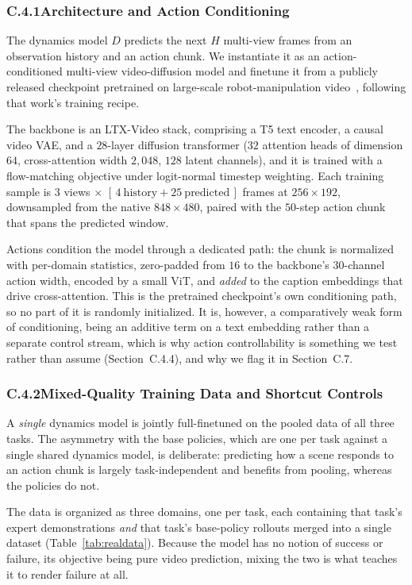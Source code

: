 \documentclass[letterpaper]{article} %
\begin{document}
\subsubsection{C.4.1\quad Architecture and Action Conditioning}

The dynamics model $D$ predicts the next $H$ multi-view frames from an
observation history and an action chunk. We instantiate it as an
action-conditioned multi-view video-diffusion model and finetune it from a
publicly released checkpoint pretrained on large-scale robot-manipulation
video~\cite{yang2026rise}, following that work's training recipe.

The backbone is an LTX-Video stack, comprising a T5 text encoder, a causal video VAE, and a
$28$-layer diffusion transformer ($32$ attention heads of dimension $64$,
cross-attention width $2{,}048$, $128$ latent channels), and it is trained with a flow-matching
objective under logit-normal timestep weighting. Each training sample is
$3$ views $\times$ $[\,4\ \text{history} + 25\ \text{predicted}\,]$ frames at
$256{\times}192$, downsampled from the native $848{\times}480$, paired with the
$50$-step action chunk that spans the predicted window.

Actions condition the model through a dedicated path: the chunk is normalized
with per-domain statistics, zero-padded from $16$ to the backbone's $30$-channel
action width, encoded by a small ViT, and \emph{added} to the caption embeddings
that drive cross-attention. This is the pretrained checkpoint's own conditioning
path, so no part of it is randomly initialized. It is, however, a comparatively
weak form of conditioning, being an additive term on a text embedding rather than a
separate control stream, which is why action controllability is something we
test rather than assume (Section~C.4.4), and why we flag it in Section~C.7.

\subsubsection{C.4.2\quad Mixed-Quality Training Data and Shortcut Controls}

A \emph{single} dynamics model is jointly full-finetuned on the pooled data of
all three tasks. The asymmetry with the base policies, which are one per task against a single
shared dynamics model, is deliberate: predicting how a scene responds to an
action chunk is largely task-independent and benefits from pooling, whereas the
policies do not.

The data is organized as three domains, one per task, each containing that task's
expert demonstrations \emph{and} that task's base-policy rollouts merged into a
single dataset (Table~\ref{tab:realdata}). Because the model has no notion of
success or failure, its objective being pure video prediction, mixing the two is
what teaches it to render failure at all.
\end{document}
